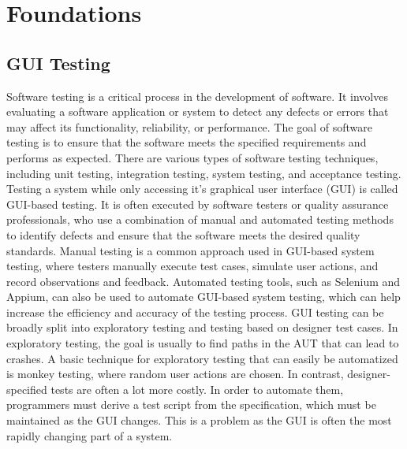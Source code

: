 \chapter{Foundations}
\label{ch:SecondContent}

\section{GUI Testing}
\label{sec:SecondContent:FirstSection}
Software testing is a critical process in the development of software. It involves evaluating a software application or system to detect any defects or errors that may affect its functionality, reliability, or performance. The goal of software testing is to ensure that the software meets the specified requirements and performs as expected. There are various types of software testing techniques, including unit testing, integration testing, system testing, and acceptance testing. Testing a system while only accessing it's graphical user interface (GUI) is called GUI-based testing. It is often executed by software testers or quality assurance professionals, who use a combination of manual and automated testing methods to identify defects and ensure that the software meets the desired quality standards. Manual testing is a common approach used in GUI-based system testing, where testers manually execute test cases, simulate user actions, and record observations and feedback. Automated testing tools, such as Selenium and Appium, can also be used to automate GUI-based system testing, which can help increase the efficiency and accuracy of the testing process.
GUI testing can be broadly split into exploratory testing and testing based on designer test cases. In exploratory testing, the goal is usually to find paths in the AUT that can lead to crashes. A basic technique for exploratory testing that can easily be automatized is monkey testing, where random user actions are chosen. In contrast, designer-specified tests are often a lot more costly. In order to automate them, programmers must derive a test script from the specification, which must be maintained as the GUI changes. This is a problem as the GUI is often the most rapidly changing part of a system.

